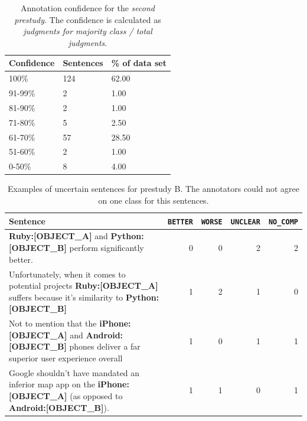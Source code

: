 \begin{table}[h]
\caption{Annotation confidence for the \emph{second prestudy}. The confidence is calculated as \emph{judgments for majority class / total judgments}.}
\label{fig:pre_b_agg}
\begin{tabularx}{\textwidth}{XXX}
\toprule
Confidence & Sentences & \% of data set \\
\midrule
100\%	&	124	&	62.00	 \\ 
91-99\%	&	2	&	1.00	 \\ 
81-90\%	&	2	&	1.00	 \\ 
71-80\%	&	5	&	2.50	 \\ 
61-70\%	&	57	&	28.50	 \\ 
51-60\%	&	2	&	1.00	 \\ 
0-50\%	&	8	&	4.00	 \\ 
\bottomrule
\end{tabularx}
\end{table}



\begin{table}[h]
\centering
\caption{Examples of uncertain sentences for prestudy B. The annotators could not agree on one class for this sentences. }
\label{tbl:pre_2_res}
\begin{tabularx}{\textwidth}{Xrrrr}
\toprule
 Sentence        & \texttt{BETTER} & \texttt{WORSE} & \texttt{UNCLEAR} & \texttt{NO\_COMP}          \\ \midrule
\textbf{{\color[HTML]{9A14B2}Ruby:{[}OBJECT\_A{]}}} and \textbf{{\color[HTML]{6CB219} Python:{[}OBJECT\_B{]}}} perform significantly better. & 0 & 0 & 2 & 2 \\

Unfortunately, when it comes to potential projects \textbf{{\color[HTML]{9A14B2}Ruby:{[}OBJECT\_A{]}}} suffers because it's similarity to \textbf{{\color[HTML]{6CB219} Python:{[}OBJECT\_B{]}}} & 1 & 2 & 1 & 0 \\


Not to mention that the \textbf{{\color[HTML]{9A14B2}iPhone:{[}OBJECT\_A{]}}} and \textbf{{\color[HTML]{6CB219} Android:{[}OBJECT\_B{]}}} phones deliver a far superior user experience overall & 1 & 0 & 1 & 1 \\

Google shouldn't have mandated an inferior map app on the \textbf{{\color[HTML]{9A14B2}iPhone:{[}OBJECT\_A{]}}} (as opposed to \textbf{{\color[HTML]{6CB219} Android:{[}OBJECT\_B{]}}}). & 1 & 1 & 0 & 1 \\



\bottomrule                              
\end{tabularx}
\end{table}


